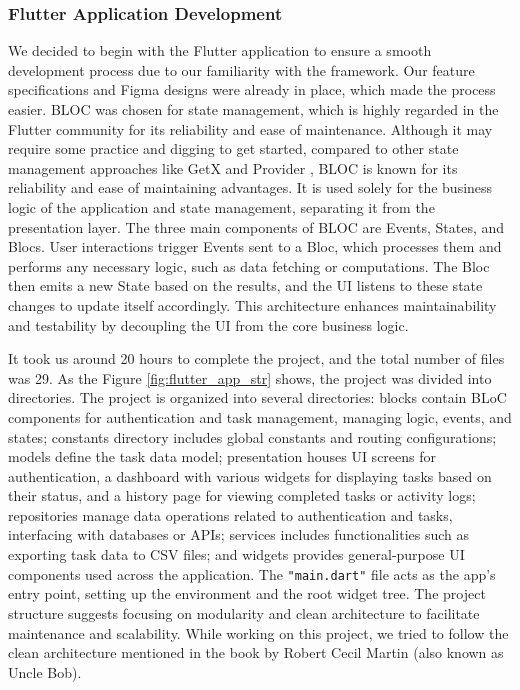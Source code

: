 \subsubsection{Flutter Application Development}
We decided to begin with the Flutter application to ensure a smooth development process due to our familiarity with the framework. Our feature specifications and Figma designs were already in place, which made the process easier. BLOC \cite{bloc} was chosen for state management, which is highly regarded in the Flutter community for its reliability and ease of maintenance. Although it may require some practice and digging to get started, compared to other state management approaches like GetX \cite{getX} and Provider \cite{provider}, BLOC is known for its reliability and ease of maintaining advantages. It is used solely for the business logic of the application and state management, separating it from the presentation layer. The three main components of BLOC are Events, States, and Blocs. User interactions trigger Events sent to a Bloc, which processes them and performs any necessary logic, such as data fetching or computations. The Bloc then emits a new State based on the results, and the UI listens to these state changes to update itself accordingly. This architecture enhances maintainability and testability by decoupling the UI from the core business logic.

\par
It took us around 20 hours to complete the project, and the total number of files was 29. As the Figure \ref*{fig:flutter_app_str} shows, the project was divided into directories. The project is organized into several directories: blocks contain BLoC components for authentication and task management, managing logic, events, and states; constants directory includes global constants and routing configurations; models define the task data model; presentation houses UI screens for authentication, a dashboard with various widgets for displaying tasks based on their status, and a history page for viewing completed tasks or activity logs; repositories manage data operations related to authentication and tasks, interfacing with databases or APIs; services includes functionalities such as exporting task data to CSV files; and widgets provides general-purpose UI components used across the application. The \verb|"main.dart"| file acts as the app's entry point, setting up the environment and the root widget tree. The project structure suggests focusing on modularity and clean architecture to facilitate maintenance and scalability. While working on this project, we tried to follow the clean architecture mentioned in the book \cite{martin2009clean} by Robert Cecil Martin (also known as Uncle Bob).
